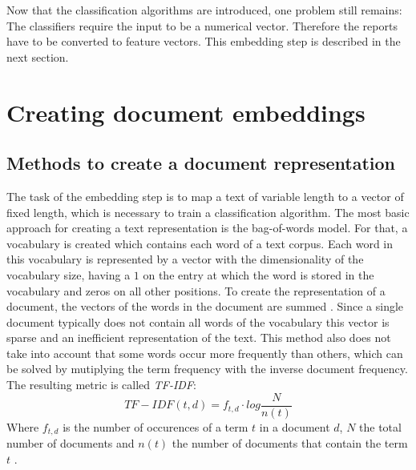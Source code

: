 Now that the classification algorithms are introduced, one problem still remains:
The classifiers require the input to be a numerical vector.
Therefore the reports have to be converted to feature vectors.
This embedding step is described in the next section.


\section{Creating document embeddings}
\label{sec:creating_document_embeddings}
\subsection{Methods to create a document representation}
\label{subsec:methods_for_document_representation}
The task of the embedding step is to map a text of variable length to a vector of fixed length, which is necessary to train a classification algorithm.
The most basic approach for creating a text representation is the bag-of-words model.
For that, a vocabulary is created which contains each word of a text corpus.
Each word in this vocabulary is represented by a vector with the dimensionality of the vocabulary size, having a $1$ on the entry at which the word is stored in the vocabulary and zeros on all other positions.
To create the representation of a document, the vectors of the words in the document are summed \cite[p. 13]{Grzegorczyk2018}.
Since a single document typically does not contain all words of the vocabulary this vector is sparse and an inefficient representation of the text.
This method also does not take into account that some words occur more frequently than others, which can be solved by mutiplying the term frequency with the inverse document frequency.
The resulting metric is called \textit{TF-IDF}:
\begin{equation}
    TF-IDF(t,d) = f_{t,d} \cdot log \frac{N}{n(t)}
    \label{equation:tf_idf}
\end{equation}
Where $f_{t,d}$ is the number of occurences of a term $t$ in a document $d$, $N$ the total number of documents and $n(t)$ the number of documents that contain the term $t$ \cite[p. 13]{Grzegorczyk2018}.

